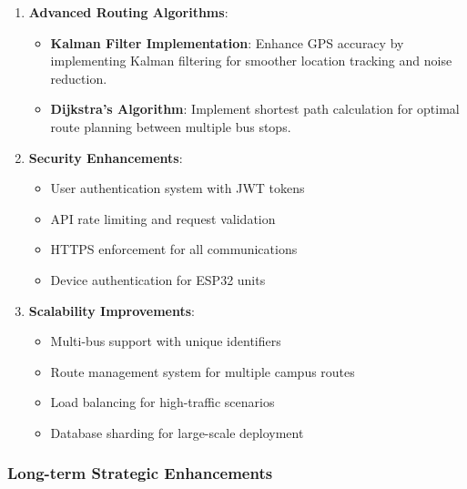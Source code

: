 \documentclass[12pt,a4paper]{article}
\begin{document}
\begin{enumerate}
    \item \textbf{Advanced Routing Algorithms}:
    \begin{itemize}
        \item \textbf{Kalman Filter Implementation}: Enhance GPS accuracy by implementing Kalman filtering for smoother location tracking and noise reduction.
        \item \textbf{Dijkstra's Algorithm}: Implement shortest path calculation for optimal route planning between multiple bus stops.
    \end{itemize}

    \item \textbf{Security Enhancements}:
    \begin{itemize}
        \item User authentication system with JWT tokens
        \item API rate limiting and request validation
        \item HTTPS enforcement for all communications
        \item Device authentication for ESP32 units
    \end{itemize}

    \item \textbf{Scalability Improvements}:
    \begin{itemize}
        \item Multi-bus support with unique identifiers
        \item Route management system for multiple campus routes
        \item Load balancing for high-traffic scenarios
        \item Database sharding for large-scale deployment
    \end{itemize}
\end{enumerate}

\subsubsection{Long-term Strategic Enhancements}
\end{document}
